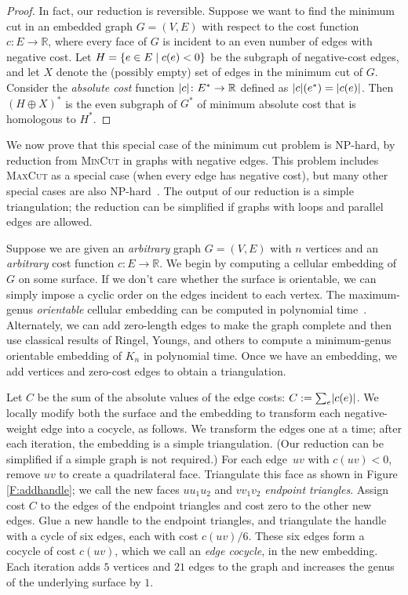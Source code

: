 \documentclass[11pt,twoside]{article}
\def\Real{\mathbb{R}}
\begin{document}
{\begin{proof}
In fact, our reduction is reversible.  Suppose we want to find the minimum cut in an embedded graph $G = (V, E)$ with respect to the cost function $c\colon E\to \Real$, where every face of $G$ is incident to an even number of edges with negative cost.  Let $H = \{ {e\in E}\mid {c(e)<0} \}$ be the subgraph of negative-cost edges, and let $X$ denote the (possibly empty) set of edges in the minimum cut of $G$.  Consider the \emph{absolute cost} function $\abs{c}\colon E^*\to \Real$ defined as $\mathopen| c \mathclose|(e^*) = \mathopen| c(e) \mathclose|$.  Then $(H\oplus X)^*$ is the even subgraph of $G^*$ of minimum absolute cost that is homologous to $H^*$.
\end{proof}

We now prove that this special case of the minimum cut problem is {NP}-hard, by  reduction from \textsc{MinCut} in graphs with negative edges.  This problem includes \textsc{MaxCut} as a special case (when every edge has negative cost), but many other special cases are also {NP}-hard~\cite{mrr-edofm-03}.  The output of our reduction is a simple triangulation; the reduction can be simplified if graphs with loops and parallel edges are allowed.

Suppose we are given an \emph{arbitrary} graph $G = (V,E)$ with $n$ vertices and an \emph{arbitrary} cost function $c\colon E\to \Real$.  We begin by computing a cellular embedding of $G$ on some surface.  If we don't care whether the surface is orientable, we can simply impose a cyclic order on the edges incident to each vertex.
The maximum-genus \emph{orientable} cellular embedding can be computed in polynomial time~\cite{fgm-fmggi-88}.  Alternately, we can add zero-length edges to make the graph complete and then use classical results of Ringel, Youngs, and others \cite{ry-shmcp-68,r-mct-74} to compute a minimum-genus orientable embedding of $K_n$ in polynomial time.  Once we have an embedding, we add vertices and zero-cost edges to obtain a triangulation.

Let $C$ be the sum of the absolute values of the edge costs: $C:= \sum_e \mathopen| c(e) \mathclose|$.  We locally modify both the surface and the embedding to transform each negative-weight edge into a cocycle, as follows.  We transform the edges one at a time; after each iteration, the embedding is a simple triangulation.  (Our reduction can be simplified if a simple graph is not required.)  For each edge~$uv$ with $c(uv)<0$, remove $uv$ to create a quadrilateral face.  Triangulate this face as shown in Figure \ref{F:addhandle}; we call the new faces $uu_1u_2$ and $vv_1v_2$ \emph{endpoint triangles}.  Assign cost $C$ to the edges of the endpoint triangles and cost zero to the other new edges. Glue a new handle to the endpoint triangles, and triangulate the handle with a cycle of six edges, each with cost $c(uv)/6$.  These six edges form a cocycle of cost $c(uv)$, which we call an \emph{edge cocycle}, in the new embedding.  Each iteration adds $5$ vertices and $21$ edges to the graph and increases the genus of the underlying surface by $1$.

}
\end{document}
